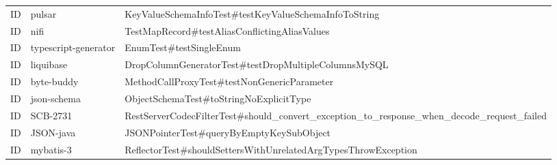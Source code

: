 \begin{table}[t]
\begin{tabular}{lll}
ID & pulsar & KeyValueSchemaInfoTest\#testKeyValueSchemaInfoToString \\
ID & nifi & TestMapRecord\#testAliasConflictingAliasValues \\
ID & typescript-generator & EnumTest\#testSingleEnum \\
ID & liquibase & DropColumnGeneratorTest\#testDropMultipleColumnsMySQL \\
ID & byte-buddy & MethodCallProxyTest\#testNonGenericParameter \\
ID & json-schema & ObjectSchemaTest\#toStringNoExplicitType \\
ID & SCB-2731 & RestServerCodecFilterTest\#should\_convert\_exception\_to\_response\_when\_decode\_request\_failed \\
ID & JSON-java & JSONPointerTest\#queryByEmptyKeySubObject \\
ID & mybatis-3 & ReflectorTest\#shouldSettersWithUnrelatedArgTypesThrowException \\
\bottomrule
\end{tabular}
\end{table}

